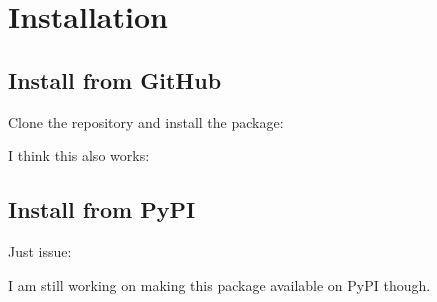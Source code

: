 \documentclass[letterpaper,10pt,english]{sphinxmanual}
\begin{document}
\chapter{Installation}
\label{\detokenize{installation:installation}}\label{\detokenize{installation::doc}}

\section{Install from GitHub}
\label{\detokenize{installation:install-from-github}}
Clone the repository and install the package:

%
\begin{sphinxVerbatim}[commandchars=\\\{\}]
  
 
  
\end{sphinxVerbatim}

I think this also works:

%
\begin{sphinxVerbatim}[commandchars=\\\{\}]
   
\end{sphinxVerbatim}


\section{Install from PyPI}
\label{\detokenize{installation:install-from-pypi}}
Just issue:

%
\begin{sphinxVerbatim}[commandchars=\\\{\}]
  
\end{sphinxVerbatim}

I am still working on making this package available on PyPI though.
\end{document}
